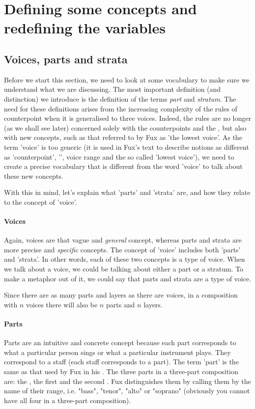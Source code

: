\chapter{Defining some concepts and redefining the variables} \label{chapter:defining-some-concepts-and-redifing-the-variables}
\section{Voices, parts and strata}\label{section:parts-and-strata}
Before we start this section, we need to look at some vocabulary to make sure we understand what we are discussing. The most important definition (and distinction) we introduce is the definition of the terms \textit{part} and \textit{stratum}. The need for these definitions arises from the increasing complexity of the rules of counterpoint when it is generalised to three voices. Indeed, the rules are no longer (as we shall see later) concerned solely with the counterpoints and the \cf, but also with new concepts, such as that referred to by Fux as 'the lowest voice'. As the term 'voice' is too generic (it is used in Fux's text to describe notions as different as 'counterpoint', '\cf', voice range and the so called 'lowest voice'), we need to create a precise vocabulary that is different from the word 'voice' to talk about these new concepts. 


With this in mind, let's explain what 'parts' and 'strata' are, and how they relate to the concept of 'voice'.

\subsubsection{Voices} Again, voices are that vague and \textit{general} concept, whereas parts and strata are more precise and \textit{specific} concepts. The concept of 'voice' includes both 'parts' and 'strata'. In other words, each of these two concepts is a type of voice. When we talk about a voice, we could be talking about either a part or a stratum. To make a metaphor out of it, we could say that parts and strata are a type of voice.

Since there are as many parts and layers as there are voices, in a composition with $n$ voices there will also be $n$ parts and $n$ layers.

\subsubsection{Parts}
Parts are an intuitive and concrete concept because each part corresponds to what a particular person sings or what a particular instrument plays. They correspond to a staff (each staff corresponds to a part). The term 'part' is the same as that used by Fux in his \gap. The three parts in a three-part composition are: the \cf, the first \cps and the second \cp. Fux distinguishes them by calling them by the name of their range, i.e. "bass", "tenor", "alto" or "soprano" (obviously you cannot have all four in a three-part composition).

